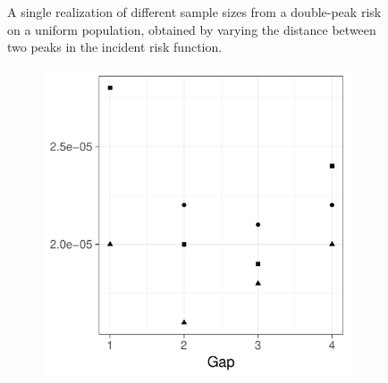 \begin{figure}[htbp]
\begin{subfigure}{0.45\textwidth}
        \label{fig:one_sample:p1.4_100_G:4}
    \end{subfigure}
    \caption[Examples showing distance between two peaks]
        {A single realization of different sample sizes from a double-peak risk on a uniform population, obtained by varying the distance between two peaks in the incident risk function.}
    \label{fig:one_sample:p1.4_100_G}
\end{figure}


\begin{figure}[htbp]
    \centering
    \begin{subfigure}[b]{0.49\textwidth}
        \includegraphics[width=\textwidth]{results/by_two_peaks/MISE-vs-risk-peak-gap}
        \caption{}
    \end{subfigure}


\end{figure}
